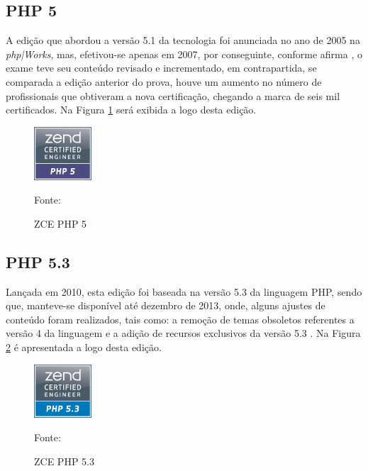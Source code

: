 \FloatBarrier 	%

\subsection{PHP 5}

A edição que abordou a versão 5.1 da tecnologia foi anunciada no ano de
2005 na \textit{php|Works}, mas, efetivou-se apenas em 2007, por conseguinte,
conforme afirma , o exame teve seu conteúdo
revisado e incrementado, em contrapartida, se comparada a edição anterior do
prova, houve um aumento no número de profissionais que obtiveram a nova
certificação, chegando a marca de seis mil certificados. Na Figura
\ref{fig:logoCertificationPHP5} será exibida a logo desta edição.

\begin{figure}[h!tb]
	\caption{ZCE PHP 5}
	\label{fig:logoCertificationPHP5}

	\centering
	\includegraphics[width=0.19\textwidth]{images/logo/php5.png}

	\centering
	\footnotesize Fonte: 
\end{figure}

\FloatBarrier 	%

\subsection{PHP 5.3}

Lançada em 2010, esta edição foi baseada na versão 5.3 da linguagem \acs{PHP},
sendo que, manteve-se disponível até dezembro de 2013, onde, alguns ajustes de
conteúdo foram realizados, tais como: a remoção de temas obsoletos referentes a versão 4
da linguagem e a adição de recursos exclusivos da versão 5.3
\cite{entrevistaAriZCEBrasil}. Na Figura \ref{fig:logoCertificationPHP53} é
apresentada a logo desta edição.

\begin{figure}[h!tb]
	\caption{ZCE PHP 5.3}
	\label{fig:logoCertificationPHP53}

	\centering
	\includegraphics[width=0.19\textwidth]{images/logo/php5-3.png}

	\centering
	\footnotesize Fonte: 
\end{figure}

